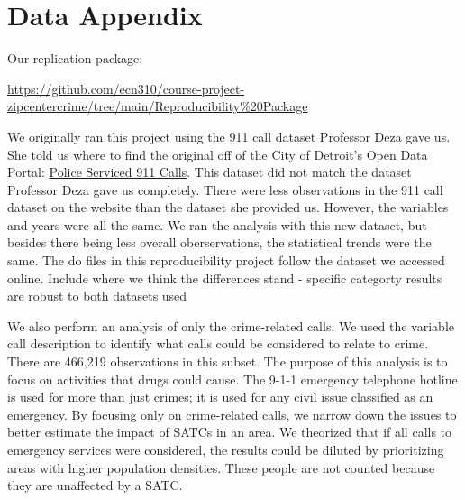 \documentclass[12pt]{article}
\begin{document}
 

\newpage
\singlespacing
\setlength\bibsep{0pt}





\newpage
\section*{Data Appendix} \label{sec:appendixa}

Our replication package:

\href{https://github.com/ecn310/course-project-zipcentercrime/tree/main/Reproducibility%20Package}{https://github.com/ecn310/course-project-zipcentercrime/tree/main/Reproducibility\%20Package}

\vspace{10pt}


We originally ran this project using the 911 call dataset Professor Deza gave us. She told us where to find the original off of the City of Detroit's Open Data Portal: \href{https://data.detroitmi.gov/datasets/detroitmi::police-serviced-911-calls/about}{Police Serviced 911 Calls}. This dataset did not match the dataset Professor Deza gave us completely. There were less observations in the 911 call dataset on the website than the dataset she provided us. However, the variables and years were all the same. We ran the analysis with this new dataset, but besides there being less overall oberservations, the statistical trends were the same. The do files in this reproducibility project follow the dataset we accessed online.
Include where we think the differences stand - specific categorty 
results are robust to both datasets used 

We also perform an analysis of only the crime-related calls. We used the variable call description to identify what calls could be considered to relate to crime. There are 466,219 observations in this subset. The purpose of this analysis is to focus on activities that drugs could cause. The 9-1-1 emergency telephone hotline is used for more than just crimes; it is used for any civil issue classified as an emergency. By focusing only on crime-related calls, we narrow down the issues to better estimate the impact of SATCs in an area. We theorized that if all calls to emergency services were considered, the results could be diluted by prioritizing areas with higher population densities. These people are not counted because they are unaffected by a SATC.
\end{document}
